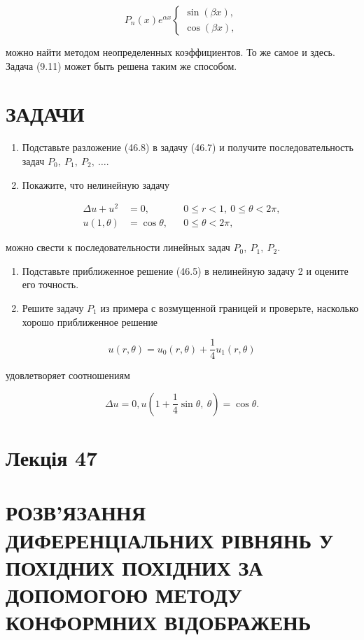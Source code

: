\documentclass[
  ukrainian,
]{article}
\begin{document}
\[
P_n(x) e^{\alpha x}
\begin{cases} \sin{(\beta x)}, \\ \cos{(\beta x)}, \end{cases}
\]

можно найти методом неопределенных коэффициентов. То же самое и здесь.
Задача (9.11) может быть решена таким же способом.

\section{ЗАДАЧИ}\label{ux437ux430ux434ux430ux447ux438}

\begin{enumerate}
\def\labelenumi{\arabic{enumi}.}
\item
  Подставьте разложение (46.8) в задачу (46.7) и получите
  последовательность задач \(P_0,\ P_1,\ P_2,\ \dots\).
\item
  Покажите, что нелинейную задачу
\end{enumerate}

\[
\begin{aligned}
\Delta u + u^2 &= 0, && 0 \leqslant r < 1,\ 0 \leqslant \theta < 2\pi, \\
u(1,\theta) &= \cos\theta, && 0 \leqslant \theta < 2\pi,
\end{aligned}
\]

можно свести к последовательности линейных задач \(P_0,\ P_1,\ P_2\).

\begin{enumerate}
\def\labelenumi{\arabic{enumi}.}
\setcounter{enumi}{2}
\item
  Подставьте приближенное решение (46.5) в нелинейную задачу 2 и оцените
  его точность.
\item
  Решите задачу \(P_1\) из примера с возмущенной границей и проверьте,
  насколько хорошо приближенное решение
\end{enumerate}

\[
u(r,\theta) = u_0(r,\theta) + \frac{1}{4}u_1(r,\theta)
\]

удовлетворяет соотношениям

\[
\Delta u = 0,
u\left(1 + \frac{1}{4}\sin\theta,\ \theta\right) = \cos\theta.
\]

\section{Лекція 47}\label{ux43bux435ux43aux446ux456ux44f-47}

\section{РОЗВ'ЯЗАННЯ ДИФЕРЕНЦІАЛЬНИХ РІВНЯНЬ У ПОХІДНИХ ПОХІДНИХ ЗА
ДОПОМОГОЮ МЕТОДУ КОНФОРМНИХ
ВІДОБРАЖЕНЬ}\label{ux440ux43eux437ux432ux44fux437ux430ux43dux43dux44f-ux434ux438ux444ux435ux440ux435ux43dux446ux456ux430ux43bux44cux43dux438ux445-ux440ux456ux432ux43dux44fux43dux44c-ux443-ux43fux43eux445ux456ux434ux43dux438ux445-ux43fux43eux445ux456ux434ux43dux438ux445-ux437ux430-ux434ux43eux43fux43eux43cux43eux433ux43eux44e-ux43cux435ux442ux43eux434ux443-ux43aux43eux43dux444ux43eux440ux43cux43dux438ux445-ux432ux456ux434ux43eux431ux440ux430ux436ux435ux43dux44c}
\end{document}
